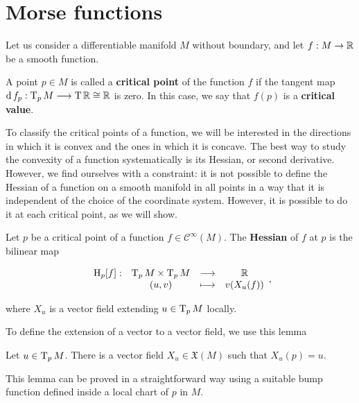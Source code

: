 \section{Morse functions} \label{section:morse_functions}

Let us consider a differentiable manifold $M$ without boundary, and let $f : M \rightarrow \mathbb{R}$ be a smooth function.

\begin{deff}
	A point $p \in M$ is called a {\bf critical point} of the function $f$ if the tangent map $\operatorname d f_p : \operatorname T_pM \longrightarrow \operatorname T\mathbb{R} \cong \mathbb{R}$ is zero. In this case, we say that $f(p)$ is a {\bf critical value}.
\end{deff}

To classify the critical points of a function, we will be interested in the directions in which it is convex and the ones in which it is concave. The best way to study the convexity of a function systematically is its Hessian, or second derivative. However, we find ourselves with a constraint: it is not possible to define the Hessian of a function on a smooth manifold in all points in a way that it is independent of the choice of the coordinate system. However, it is possible to do it at each critical point, as we will show.

\begin{deff}
	Let $p$ be a critical point of a function $f \in \mathcal{C}^{\infty}(M)$. The {\bf Hessian} of $f$ at $p$ is the bilinear map

\begin{displaymath}
	\begin{array}{rccc} \operatorname H_p[f] : & \operatorname T_pM \times \operatorname T_pM & \longrightarrow & \mathbb{R} \\ & (u,v) & \longmapsto & v(X_u(f)) \end{array} ,
\end{displaymath}

where $X_u$ is a vector field extending $u \in \operatorname T_pM$ locally.
\end{deff}

To define the extension of a vector to a vector field, we use this lemma

\begin{lema}
	Let $u \in \operatorname T_pM$. There is a vector field $X_u \in \mathfrak{X}(M)$ such that $X_u(p) = u$.
\end{lema}

This lemma can be proved in a straightforward way using a suitable bump function defined inside a local chart of $p$ in $M$.

